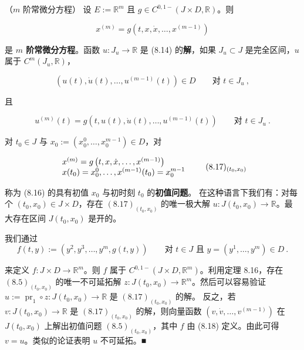 \begin{example}

\begin{items}
\item

（$ m $ 阶常微分方程） 设 $ E:=\mathbb{R}^{m} $ 且 $ g\in C^{0,1-}(J\times D,\mathbb{R}) $。则

\begin{equation}
x^{(m)}=g(t,x,\dot{x},\ldots,x^{(m-1)})\tag{8.16}
\end{equation}

是 \textbf{$ m $ 阶常微分方程}。函数 $ u:J_{u}\to\mathbb{R} $ 是 (8.14) 的\textbf{解}，如果 $ J_{u}\subset J $ 是完全区间，$ u $ 属于 $ C^{m}(J_{u},\mathbb{R}) $，

\[
\left(u(t),\dot{u}(t),\ldots,u^{(m-1)}(t)\right)\in D\qquad\text{对 }t\in J_{u}\ ,
\]

且

\[
u^{(m)}(t)=g\left(t,u(t),\dot{u}(t),\ldots,u^{(m-1)}(t)\right)\qquad\text{对 }t\in J_{u} \ .
\]

对 $ t_{0}\in J $ 与 $ x_{0}:=(x_{0}^{0},\ldots,x_{0}^{m-1})\in D $，对

\begin{equation}
\begin{array}{l}x^{(m)}=g\left(t,x,\dot{x},\ldots,x^{(m-1)}\right)\\ x(t_{0})=x_{0}^{0},\ldots,x^{(m-1)}(t_{0})=x_{0}^{m-1}\end{array}\tag*{(8.17)${}_{(t_0,x_0)}$}
\end{equation}

称为 (8.16) 的具有初值 $ x_{0} $ 与初时刻 $ t_{0} $ 的\textbf{初值问题}。
在这种语言下我们有：对每个 $ (t_{0},x_{0})\in J\times D $，存在 $ (8.17)_{(t_{0},x_{0})} $ 的唯一极大解 $ u:J(t_{0},x_{0})\to\mathbb{R} $。最大存在区间 $ J(t_{0},x_{0}) $ 是开的。

\proofhead
我们通过
\begin{equation}
f(t,y):=\left(y^{2},y^{3},\ldots,y^{m},g(t,y)\right)\qquad\text{对 }t\in J\text{ 且 }y=(y^{1},\ldots,y^{m})\in D \ .\tag{8.18}
\end{equation}

来定义 $ f:J\times D\to\mathbb{R}^{m} $。则 $ f $ 属于 $ C^{0,1-}(J\times D,\mathbb{R}^{m}) $。利用定理 8.16，存在 $ (8.5)_{(t_{0},x_{0})} $ 的唯一不可延拓解 $ z:J(t_{0},x_{0})\to\mathbb{R}^{m} $。然后可以容易验证 $ u:=\operatorname{pr}_{1}\circ z:J(t_{0},x_{0})\to\mathbb{R} $ 是 $ (8.17)_{(t_{0},x_{0})} $ 的解。
反之，若 $ v:J(t_{0},x_{0})\to\mathbb{R} $ 是 $ (8.17)_{(t_{0},x_{0})} $ 的解，则向量函数 $ (v,\dot{v},\ldots,v^{(m-1)}) $ 在 $ J(t_{0},x_{0}) $ 上解出初值问题 $ (8.5)_{(t_{0},x_{0})} $，其中 $ f $ 由 (8.18) 定义。由此可得 $ v=u $。类似的论证表明 $ u $ 不可延拓。\nobreak\hspace{0.35em}■


\end{items}
\end{example}
